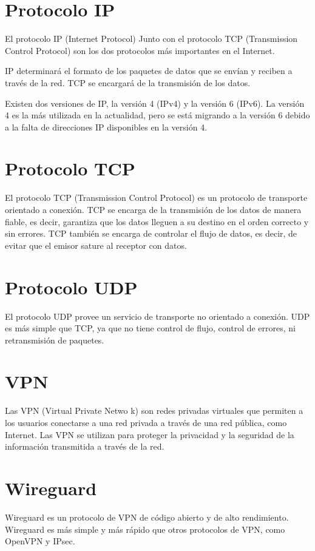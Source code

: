 \section{Protocolo IP} %

El protocolo IP (Internet Protocol) Junto con el protocolo TCP (Transmission Control Protocol) son los dos protocolos más importantes en el Internet.

IP determinará el formato de los paquetes de datos que se envían y reciben a través de la red. TCP se encargará de la transmisión de los datos.

Existen dos versiones de IP, la versión 4 (IPv4) y la versión 6 (IPv6). La versión 4 es la más utilizada en la actualidad, pero se está migrando a la versión 6 debido a la falta de direcciones IP disponibles en la versión 4.

\section{Protocolo TCP} %
El protocolo TCP (Transmission Control Protocol) es un protocolo de transporte orientado a conexión. TCP se encarga de la transmisión de los datos de manera fiable, es decir, garantiza que los datos lleguen a su destino en el orden correcto y sin errores. TCP también se encarga de controlar el flujo de datos, es decir, de evitar que el emisor sature al receptor con datos.

\section{Protocolo UDP} %

El protocolo UDP provee un servicio de transporte no orientado a conexión. UDP es más simple que TCP, ya que no tiene control de flujo, control de errores, ni retransmisión de paquetes.

\section{VPN} %
Las VPN (Virtual Private Netwo  k) son redes privadas virtuales que permiten a los usuarios conectarse a una red privada a través de una red pública, como Internet. Las VPN se utilizan para proteger la privacidad y la seguridad de la información transmitida a través de la red.

\section{Wireguard} %
Wireguard es un protocolo de VPN de código abierto y de alto rendimiento. Wireguard es más simple y más rápido que otros protocolos de VPN, como OpenVPN y IPsec.


